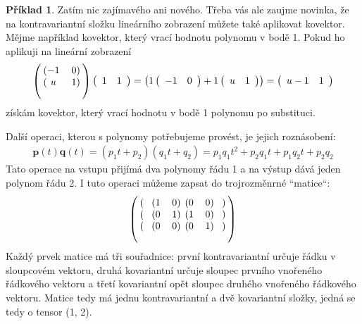 \documentclass[a5paper,12pt]{amsbook}
\theoremstyle{definition}
\newtheorem{example}{Příklad}[chapter]
\newcommand{\myvec}[1]{\bm{#1}}
\begin{document}
\begin{example}
Zatím nic zajímavého ani nového. Třeba vás ale zaujme novinka, že na kontravariantní
složku lineárního zobrazení můžete také aplikovat kovektor. Mějme například kovektor,
který vrací hodnotu polynomu v bodě 1. Pokud ho aplikuji na lineární zobrazení
\begin{equation*}
\left(\begin{blockarray}{cc}
\begin{block}{(cc)}
-1 & 0 \\
\end{block}
\begin{block}{(cc)}
 u & 1 \\
\end{block}
\end{blockarray}\right)\left(
\begin{array}{cc}
1 & 1
\end{array}\right) = \left(
1\left(\begin{array}{cc}-1 & 0\end{array}\right) + 1\left(\begin{array}{cc}u & 1\end{array}\right)
\right) = \left(\begin{array}{cc}
u - 1 & 1
\end{array}\right)
\end{equation*}
získám kovektor, který vrací hodnotu v bodě 1 polynomu po substituci.

\medskip\noindent
Další operaci, kterou s polynomy potřebujeme provést, je jejich roznásobení:
\begin{equation*}
\begin{split}
\myvec{p}(t)\myvec{q}(t) = (p_1 t + p_2)(q_1 t + q_2) = p_1q_1t^2 + p_2q_1t + p_1q_2t + p_2q_2
\end{split}
\end{equation*}
Tato operace na vstupu přijímá dva polynomy řádu 1 a na výstup dává jeden polynom
řádu 2. I tuto operaci můžeme zapsat do trojrozměnrné ``matice``:
\begin{equation*}
\left(\begin{blockarray}{cccccc}
\begin{block}{(c(cc)(cc)c)}
& 1 & 0 & 0 & 0 &\\
\end{block}
\begin{block}{(c(cc)(cc)c)}
& 0 & 1 & 1 & 0 & \\
\end{block}
\begin{block}{(c(cc)(cc)c)}
& 0 & 0 & 0 & 1 &\\
\end{block}
\end{blockarray}\right)
\end{equation*}
Každý prvek matice má tři souřadnice: první kontravariantní určuje řádku v sloupcovém vektoru,
druhá kovariantní určuje sloupec prvního vnořeného řádkového vektoru a třetí kovariantní
opět sloupec druhého vnořeného řádkového vektoru. Matice tedy má jednu kontravariantní a dvě
kovariantní složky, jedná se tedy o tensor (1, 2).


\end{example}
\end{document}

